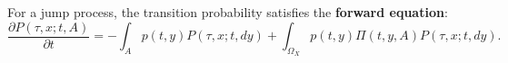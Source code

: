 For a jump process, the transition probability satisfies the \textbf{forward equation}:
$$\frac{\partial P(\tau, x; t, A)}{\partial t} = -\int_A p(t, y) P(\tau, x; t, dy) + \int_{\Omega_X} p(t, y) \Pi(t, y, A) P(\tau, x; t, dy).$$
